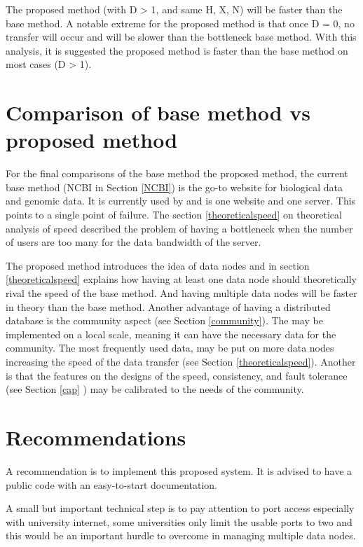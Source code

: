 \documentclass[acmsmall]{acmart}
\begin{document}
The proposed method (with D > 1, and same H, X, N) will be faster than the base method. A notable extreme for the proposed method is that once D = 0, no transfer will occur and will be slower than the bottleneck base method. With this analysis, it is suggested the proposed method is faster than the base method on most cases (D > 1). 

\section{Comparison of base method vs proposed method}

For the final comparisons of the base method the proposed method, the current base method (NCBI in Section \ref{NCBI}) is the go-to website for biological data and genomic data. It is currently used by and is one website and one server. This points to a single point of failure\cite{seqtorr}. The section \ref{theoreticalspeed} on theoretical analysis of speed described the problem of having a bottleneck when the number of users are too many for the data bandwidth of the server. 

The proposed method introduces the idea of data nodes and in section \ref{theoreticalspeed} explains how having at least one data node should theoretically rival the speed of the base method. And having multiple data nodes will be faster in theory than the base method. Another advantage of having a distributed database is the community aspect (see Section \ref{community}). The may be implemented on a local scale, meaning it can have the necessary data for the community. The most frequently used data, may be put on more data nodes increasing the speed of the data transfer (see Section \ref{theoreticalspeed}). Another is that the features on the designs of the speed, consistency, and fault tolerance (see Section \ref{cap} ) may be calibrated to the needs of the community. 

\section{Recommendations}
A recommendation is to implement this proposed system. It is advised to have a public code with an easy-to-start documentation.

A small but important technical step is to pay attention to port access especially with university internet, some universities only limit the usable ports to two and this would be an important hurdle to overcome in managing multiple data nodes.
\end{document}

